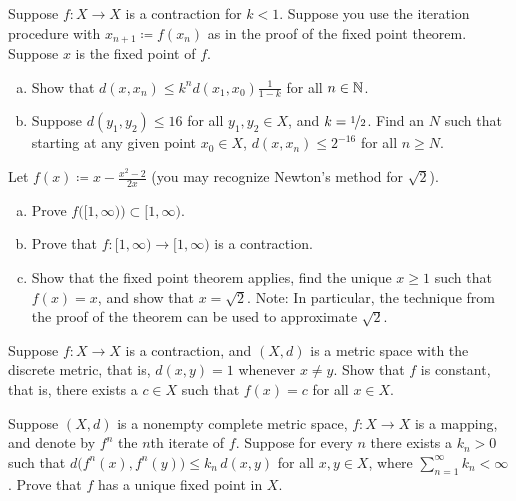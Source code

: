 \begin{exercise}
Suppose $f \colon X \to X$ is a contraction for $k < 1$.  Suppose you use the iteration
procedure with $x_{n+1} \coloneqq f(x_n)$ as in the proof of the fixed point theorem.
Suppose $x$ is the fixed
point of $f$.
\begin{enumerate}[a)]
\item
Show that $d(x,x_n) \leq k^n d(x_1,x_0) \frac{1}{1-k}$ for all $n \in {\mathbb{N}}$.
\item
Suppose $d(y_1,y_2) \leq 16$ for all $y_1,y_2 \in X$, and $k=
\nicefrac{1}{2}$.  Find an $N$ such that starting at any given point $x_0 \in X$, 
$d(x,x_n) \leq 2^{-16}$ for all $n \geq N$.
\end{enumerate}
\end{exercise}

\begin{exercise}
Let $f(x) \coloneqq x-\frac{x^2-2}{2x}$ (you may recognize Newton's method for
$\sqrt{2}$).
\begin{enumerate}[a)]
\item
Prove $f\bigl([1,\infty)\bigr) \subset [1,\infty)$.
\item
Prove that $f \colon [1,\infty) \to [1,\infty)$ is a contraction.
\item
Show that the fixed point theorem applies,
find the unique $x \geq 1$ such that $f(x) = x$,
and show that $x = \sqrt{2}$.
Note: In particular, the technique from the proof of the theorem
can be used to approximate $\sqrt{2}$.
\end{enumerate}
\end{exercise}

\begin{exercise}
Suppose $f \colon X \to X$ is a contraction, and $(X,d)$ is a metric space
with the discrete metric, that is, $d(x,y) = 1$ whenever $x \neq y$.
Show that $f$ is constant, that is,
there exists a $c \in X$ such that $f(x) = c$ for all $x \in X$.
\end{exercise}

\begin{exercise}
Suppose $(X,d)$ is a nonempty complete metric space,
$f \colon X \to X$ is a mapping, and denote
by $f^n$ the $n$th iterate of $f$.  Suppose
for every $n$ there exists a $k_n > 0$ such that
$d\bigl(f^n(x),f^n(y)\bigr) \leq k_n \, d(x,y)$
for all $x,y \in X$,
where $\sum_{n=1}^\infty k_n < \infty$.
Prove that $f$ has a unique fixed point in $X$.
\end{exercise}
